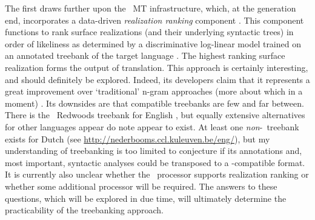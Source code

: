 The first draws further upon the \logon\ MT infrastructure, which, at the
generation end, incorporates a data-driven \emph{realization ranking} component
\citep{velldal2009empirical,velldal2006statistical,bond2011deep}. This
component functions to rank surface realizations (and their underlying
syntactic trees) in order of likeliness as determined by a discriminative
log-linear model trained on an annotated treebank of the target language
\citep{velldal2006statistical}. The highest ranking surface realization forms
the output of translation. This approach is certainly interesting, and should
definitely be explored. Indeed, its developers claim that it represents a great
improvement over `traditional' n-gram approaches (more about which in a moment)
\citep{velldal2009empirical}. Its downsides are that compatible treebanks are
few and far between. There is the \lingo\ Redwoods treebank for English
\citep{Oepen02lingoredwoods}, but equally extensive alternatives for other
languages appear do note appear to exist. At least one \emph{non}-\delphin\
treebank exists for Dutch (see \url{http://nederbooms.ccl.kuleuven.be/eng/}),
but my understanding of treebanking is too limited to conjecture if its
annotations and, most important, syntactic analyses could be transposed to a
\delphin-compatible format. It is currently also unclear whether the \ace\
processor supports realization ranking or whether some additional processor
will be required. The answers to these questions, which will be explored in due
time, will ultimately determine the practicability of the treebanking approach.

